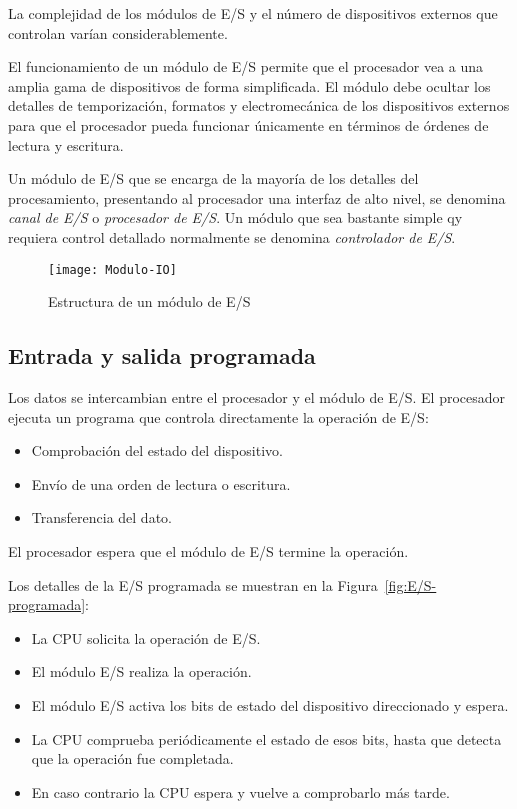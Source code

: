 La complejidad de los módulos de E/S y el número de dispositivos externos que controlan varían considerablemente.

El funcionamiento de un módulo de E/S permite que el procesador vea a una amplia gama de dispositivos de forma simplificada. El módulo debe ocultar los detalles de temporización, formatos y electromecánica de los dispositivos externos para que el procesador pueda funcionar únicamente en términos de órdenes de lectura y escritura.

Un módulo de E/S que se encarga de la mayoría de los detalles del procesamiento, presentando al procesador una interfaz de alto nivel, se denomina \textit{canal de E/S} o \textit{procesador de E/S}. Un módulo que sea bastante simple qy requiera control detallado normalmente se denomina \textit{controlador de E/S}.

\begin{figure}[h]
  \centering
  \texttt{[image: Modulo-IO]}
  \caption{Estructura de un módulo de E/S}\label{fig:Estructura-modulo-E/S}
\end{figure}

\subsection{Entrada y salida programada}

Los datos se intercambian entre el procesador y el módulo de E/S. El procesador ejecuta un programa que controla directamente la operación de E/S:\@
\begin{itemize}
  \item Comprobación del estado del dispositivo.
  \item Envío de una orden de lectura o escritura.
  \item Transferencia del dato.
\end{itemize}

El procesador espera que el módulo de E/S termine la operación.

Los detalles de la E/S programada se muestran en la Figura~\ref{fig:E/S-programada}:

\begin{itemize}
  \item La CPU solicita la operación de E/S.
  \item El módulo E/S realiza la operación.
  \item El módulo E/S activa los bits de estado del dispositivo direccionado y espera.
  \item La CPU comprueba periódicamente el estado de esos bits, hasta que detecta que la operación fue completada.
  \item En caso contrario la CPU espera y vuelve a comprobarlo más tarde.
\end{itemize}

